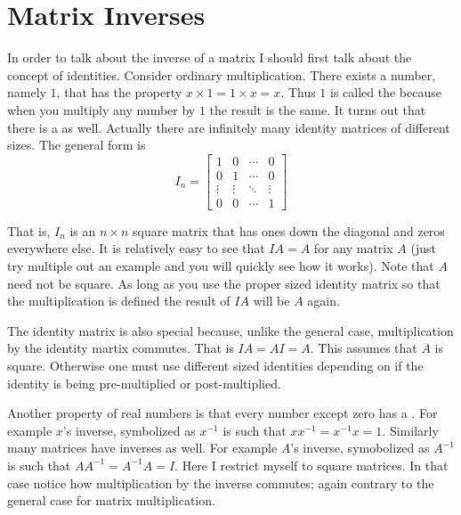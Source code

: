 
\section{Matrix Inverses}
\label{sec:matrix-inverses}

In order to talk about the inverse of a matrix I should first talk about the concept of
identities. Consider ordinary multiplication. There exists a number, namely $1$, that has the
property $x \times 1 = 1 \times x = x$. Thus $1$ is called the 
because when you multiply any number by $1$ the result is the same. It turns out that there is a
 as well. Actually there are infinitely many identity matrices of
different sizes. The general form is
\begin{displaymath}
I_n = \left[
\begin{array}{cccc}
 1 & 0 & \cdots & 0 \\
 0 & 1 & \cdots & 0 \\
 \vdots & \vdots & \ddots & \vdots \\
 0 & 0 & \cdots & 1
\end{array}
\right]
\end{displaymath}

That is, $I_n$ is an $n \times n$ square matrix that has ones down the diagonal and zeros
everywhere else. It is relatively easy to see that $IA = A$ for any matrix $A$ (just try
multiple out an example and you will quickly see how it works). Note that $A$ need not be
square. As long as you use the proper sized identity matrix so that the multiplication is
defined the result of $IA$ will be $A$ again.

The identity matrix is also special because, unlike the general case, multiplication by the
identity martix commutes. That is $IA = AI = A$. This assumes that $A$ is square. Otherwise one
must use different sized identities depending on if the identity is being pre-multiplied or
post-multiplied.

Another property of real numbers is that every number except zero has a . For example $x$'s inverse, symbolized as $x^{-1}$ is such that $xx^{-1} = x^{-1}x =
1$. Similarly many matrices have inverses as well. For example $A$'s inverse, symobolized as
$A^{-1}$ is such that $AA^{-1} = A^{-1}A = I$. Here I restrict myself to square matrices. In
that case notice how multiplication by the inverse commutes; again contrary to the general case
for matrix multiplication.

